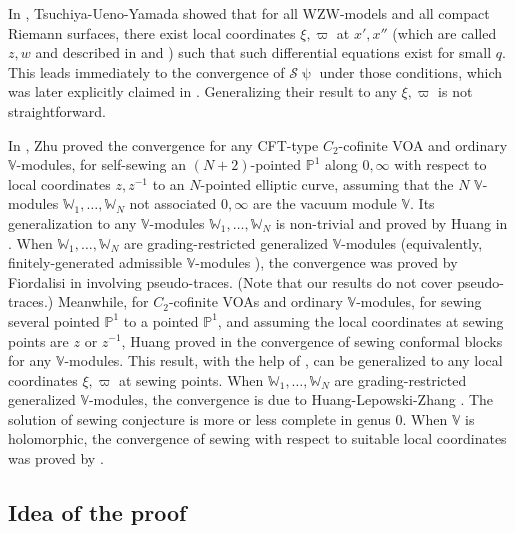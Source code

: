 \documentclass[11pt,b5paper,notitlepage]{article}
\theoremstyle{definition}
\theoremstyle{plain}
\newcommand{\mc}{\mathcal}
\newcommand{\Vbb}{\mathbb V}
\newcommand{\Wbb}{\mathbb W}
\newcommand{\Pbb}{\mathbb P}
\numberwithin{equation}{section}
\begin{document}
In \cite{TUY89}, Tsuchiya-Ueno-Yamada showed that for all WZW-models and all compact Riemann surfaces, there exist local coordinates $\xi,\varpi$ at $x',x''$ (which are called $z,w$ and described in \cite[Lemma 6.1.2]{TUY89} and \cite[Lemma 5.3.1]{Ueno97}) such that such differential equations exist for small $q$. This leads immediately to the convergence of $\mc S\uppsi$ under those conditions, which was later explicitly claimed in \cite[Thm. 5.3.4]{Ueno97}. Generalizing their result  to any $\xi,\varpi$ is not  straightforward.  


In \cite{Zhu96}, Zhu proved the convergence for any CFT-type $C_2$-cofinite VOA and ordinary $\Vbb$-modules,  for  self-sewing an $(N+2)$-pointed $\Pbb^1$ along $0,\infty$ with respect to local coordinates $z,z^{-1}$ to an $N$-pointed elliptic curve,  assuming that the $N$  $\Vbb$-modules $\Wbb_1,\dots,\Wbb_N$ not associated $0,\infty$ are the vacuum module $\Vbb$.  Its generalization to any $\Vbb$-modules $\Wbb_1,\dots,\Wbb_N$ is non-trivial and proved by Huang in \cite{Hua05b}. When  $\Wbb_1,\dots,\Wbb_N$ are grading-restricted generalized $\Vbb$-modules  (equivalently, finitely-generated admissible $\Vbb$-modules \cite{Hua09}), the convergence was proved by Fiordalisi in \cite{Fio16} involving pseudo-traces. (Note that our results do not cover pseudo-traces.)  Meanwhile, for $C_2$-cofinite VOAs and ordinary $\Vbb$-modules, for sewing several pointed $\Pbb^1$ to a pointed  $\Pbb^1$, and assuming the local coordinates at sewing points are $z$ or $z^{-1}$, Huang proved in \cite{Hua05a} the convergence of sewing conformal blocks for any $\Vbb$-modules. This result, with the help of \cite{Hua98}, can be generalized to any local coordinates $\xi,\varpi$ at sewing points. When $\Wbb_1,\dots,\Wbb_N$ are grading-restricted generalized $\Vbb$-modules, the convergence is due to Huang-Lepowski-Zhang \cite{HLZ11}.  The solution of sewing conjecture is more or less complete in genus $0$. When $\Vbb$ is holomorphic, the convergence of sewing with respect to suitable local coordinates was proved by \cite{Cod19}.




\subsection*{Idea of the proof}
\end{document}
